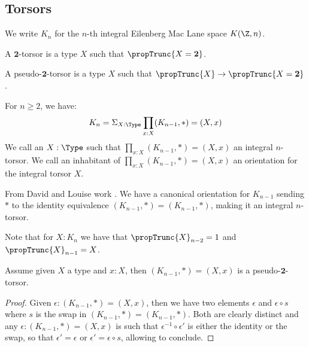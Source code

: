 
\subsection{Torsors}

We write $K_n$ for the $n$-th integral Eilenberg Mac Lane space $K(\Z,n)$.

\begin{definition}
A $\mathbf{2}$-torsor is a type $X$ such that $\propTrunc{X=\mathbf{2}}$.
\end{definition}

\begin{definition}
A pseudo-$\mathbf{2}$-torsor is a type $X$ such that $\propTrunc{X}\to \propTrunc{X=\mathbf{2}}$.
\end{definition}

\begin{lemma}
For $n\geq 2$, we have:
\[K_{n} = \Sigma_{X:\Type} \prod_{x:X}(K_{n-1},*) = (X,x)\]
We call an $X:\Type$ such that $\prod_{x:X}(K_{n-1},*) = (X,x)$ an integral $n$-torsor. We call an inhabitant of $\prod_{x:X}(K_{n-1},*) = (X,x)$ an orientation for the integral torsor $X$.
\end{lemma}

From David and Louise work \cite{}. We have a canonical orientation for $K_{n-1}$ sending $*$ to the identity equivalence $(K_{n-1},*) = (K_{n-1},*)$, making it an integral $n$-torsor.

Note that for $X:K_n$ we have that $\propTrunc{X}_{n-2} = 1$ and $\propTrunc{X}_{n-1} = X$.

\begin{lemma} 
Assume given $X$ a type and $x:X$, then $(K_{n-1},*) = (X,x)$ is a pseudo-$\mathbf{2}$-torsor.
\end{lemma}

\begin{proof}
Given $\epsilon:(K_{n-1},*) = (X,x)$, then we have two elements $\epsilon$ and $\epsilon\circ s$ where $s$ is the swap in $(K_{n-1},*)=(K_{n-1},*)$. Both are clearly distinct and any $\epsilon:(K_{n-1},*) = (X,x)$ is such that $\epsilon^{-1} \circ \epsilon'$ is either the identity or the swap, so that $\epsilon'=\epsilon$ or $\epsilon' = \epsilon\circ s$, allowing to conclude.
\end{proof}

